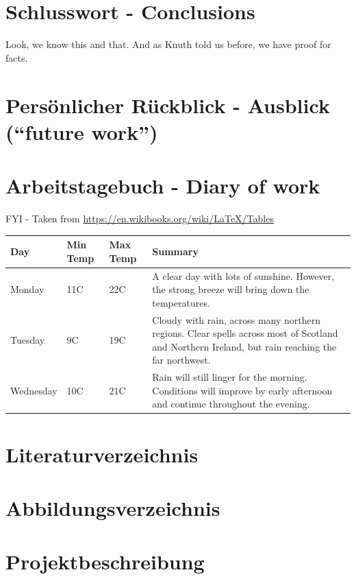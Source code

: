 \section{Schlusswort - Conclusions}
\lipsum[18] %
Look, we know this\citep{DBLP:books/aw/Knuth73} and that.
And as Knuth told us before\citep{DBLP:books/daglib/0030428},
we have proof for facts\citep{DBLP:journals/cacm/KnuthS21}.

\section{Persönlicher Rückblick - Ausblick (``future work'')}
\lipsum[19] %


\appendix

\section{Arbeitstagebuch - Diary of work}
FYI - Taken from \url{https://en.wikibooks.org/wiki/LaTeX/Tables}

\begin{tabular}{ | l | l | l | p{5cm} |}
  \hline
  Day & Min Temp & Max Temp & Summary \\ \hline
  Monday & 11C & 22C & A clear day with lots of sunshine.
  However, the strong breeze will bring down the temperatures. \\ \hline
  Tuesday & 9C & 19C & Cloudy with rain, across many northern regions. Clear spells
  across most of Scotland and Northern Ireland,
  but rain reaching the far northwest. \\ \hline
  Wednesday & 10C & 21C & Rain will still linger for the morning.
  Conditions will improve by early afternoon and continue
  throughout the evening. \\
  \hline
\end{tabular}

\section{Literaturverzeichnis}
\printbibliography %

\section{Abbildungsverzeichnis} %
\listoffigures

\section{Projektbeschreibung}
\lipsum[11] %




